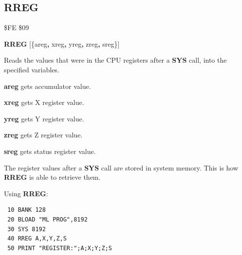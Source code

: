 
\newpage
\subsection{RREG}
\begin{description}[leftmargin=2cm,style=nextline]
\item [Token:] \$FE \$09
\item [Format:] {\bf RREG} [\{areg{\bf,} xreg{\bf,} yreg{\bf,} zreg{\bf,} sreg\}]
\item [Usage:] Reads the values that were in the CPU registers
               after a {\bf SYS} call, into the specified variables.

               {\bf areg} gets accumulator value.

               {\bf xreg} gets X register value.

               {\bf yreg} gets Y register value.

               {\bf zreg} gets Z register value.

               {\bf sreg} gets status register value.

\item [Remarks:] The register values after a {\bf SYS} call are stored
                 in system memory. This is how
                 {\bf RREG} is able to retrieve them.

\item [Example:] Using {\bf RREG}:
\begin{tcolorbox}[colback=black,coltext=white]
\verbatimfont{\codefont}
\begin{verbatim}
 10 BANK 128
 20 BLOAD "ML PROG",8192
 30 SYS 8192
 40 RREG A,X,Y,Z,S
 50 PRINT "REGISTER:";A;X;Y;Z;S
\end{verbatim}
\end{tcolorbox}
\end{description}


\newpage
